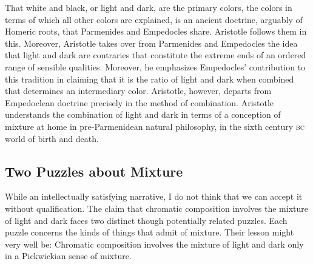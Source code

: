 That white and black, or light and dark, are the primary colors, the colors in terms of which all other colors are explained, is an ancient doctrine, arguably of Homeric roots, that Parmenides and Empedocles share. Aristotle follows them in this. Moreover, Aristotle takes over from Parmenides and Empedocles the idea that light and dark are contraries that constitute the extreme ends of an ordered range of sensible qualities. Moreover, he emphasizes Empedocles' contribution to this tradition in claiming that it is the ratio of light and dark when combined that determines an intermediary color. Aristotle, however, departs from Empedoclean doctrine precisely in the method of combination. Aristotle understands the combination of light and dark in terms of a conception of mixture at home in pre-Parmenidean natural philosophy, in the sixth century \textsc{bc} world of birth and death. 



\subsection{Two Puzzles about Mixture} %
\label{sub:two_puzzles_about_mixture}

While an intellectually satisfying narrative, I do not think that we can accept it without qualification. The claim that chromatic composition involves the mixture of light and dark faces two distinct though potentially related puzzles. Each puzzle concerns the kinds of things that admit of mixture. Their lesson might very well be: Chromatic composition involves the mixture of light and dark only in a Pickwickian sense of mixture.

